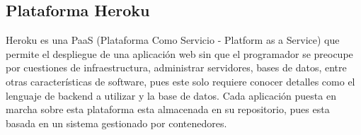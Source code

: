 %
%
%
%

\subsection{Plataforma Heroku}

Heroku es una PaaS (Plataforma Como Servicio - Platform as a Service) que permite el despliegue de una aplicación web sin que el programador se preocupe por cuestiones de infraestructura, administrar servidores, bases de datos, entre otras características de software, pues este solo requiere conocer detalles como el lenguaje de backend a utilizar y  la base de datos. Cada aplicación puesta en marcha sobre esta plataforma esta almacenada en su repositorio, pues esta basada en un sistema gestionado por contenedores.\cite{Hero}\\

